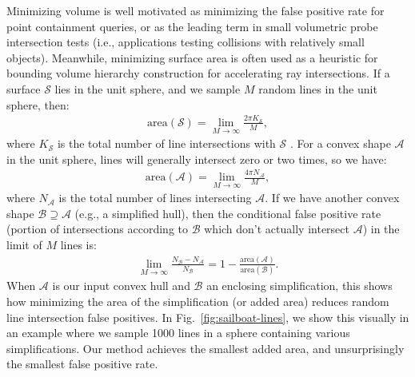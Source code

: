 \documentclass{egpubl}
\newcommand{\newhl}[1]{#1}
\begin{document}
\newhl{
Minimizing volume is well motivated as minimizing the false positive rate for point containment queries, or as the leading term in small volumetric probe intersection tests (i.e., applications testing collisions with relatively small objects).
Meanwhile, minimizing surface area is often used as a heuristic for bounding volume hierarchy construction \cite{GoldsmithS87,MacDonaldB90} for accelerating ray intersections.
If a surface $\mathcal{S}$ lies in the unit sphere, and we sample $M$ random lines in the unit sphere, then:
\begin{align}
\text{area}(\mathcal{S})  = \lim_{M \rightarrow \infty} \frac{2 \pi K_\mathcal{S}}{M},
\end{align}
where $K_\mathcal{S}$ is the total number of line intersections with $\mathcal{S}$ \cite{LingMSJ25}.
For a convex shape $\mathcal{A}$ in the unit sphere, lines will generally intersect zero or two times, so we have:
\begin{align}
\text{area}(\mathcal{A})  = \lim_{M \rightarrow \infty} \frac{4 \pi N_\mathcal{A}}{M},
\end{align}
where $N_\mathcal{A}$ is the total number of lines intersecting $\mathcal{A}$.
If we have another convex shape $\mathcal{B} \supseteq \mathcal{A}$ (e.g., a simplified hull), then the conditional false positive rate (portion of intersections according to $\mathcal{B}$ which don't actually intersect $\mathcal{A}$) in the limit of $M$ lines is:
\begin{align}
\lim_{M \rightarrow \infty} \frac{N_\mathcal{B} - N_\mathcal{A}}{N_\mathcal{B}} = 1 - \frac{\text{area}(\mathcal{A})}{\text{area}(\mathcal{B})}.
\end{align}
When $\mathcal{A}$ is our input convex hull and $\mathcal{B}$ an enclosing simplification, this shows how minimizing the area of the simplification (or added area) reduces random line intersection false positives.
In Fig.~\ref{fig:sailboat-lines}, we show this visually in an example where we sample 1000 lines in a sphere containing various simplifications. Our method achieves the smallest added area, and unsurprisingly the smallest false positive rate.
}
\end{document}
